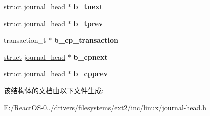 \begin{DoxyCompactItemize}
\hyperlink{interfacestruct}{struct} \hyperlink{structjournal__head}{journal\+\_\+head} $\ast$ {\bfseries b\+\_\+tnext}
\item 
\mbox{\label{structjournal__head_a349c78e223bb0dee1789861c85523d8a}} 
\hyperlink{interfacestruct}{struct} \hyperlink{structjournal__head}{journal\+\_\+head} $\ast$ {\bfseries b\+\_\+tprev}
\item 
\mbox{\label{structjournal__head_ab083720be71c276e1ddb9d14ac33ef60}} 
transaction\+\_\+t $\ast$ {\bfseries b\+\_\+cp\+\_\+transaction}
\item 
\mbox{\label{structjournal__head_a0921cc0844985bda4edc455be268d801}} 
\hyperlink{interfacestruct}{struct} \hyperlink{structjournal__head}{journal\+\_\+head} $\ast$ {\bfseries b\+\_\+cpnext}
\item 
\mbox{\label{structjournal__head_af163cbd5a77379496075841600fb1917}} 
\hyperlink{interfacestruct}{struct} \hyperlink{structjournal__head}{journal\+\_\+head} $\ast$ {\bfseries b\+\_\+cpprev}
\end{DoxyCompactItemize}


该结构体的文档由以下文件生成\+:\begin{DoxyCompactItemize}
\item 
E\+:/\+React\+O\+S-\/0../drivers/filesystems/ext2/inc/linux/journal-\/head.\+h\end{DoxyCompactItemize}
